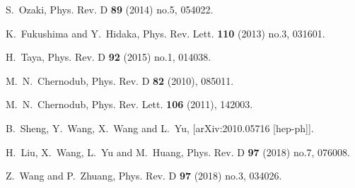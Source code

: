 \begin{thebibliography}{1000}
S.~Ozaki,
Phys. Rev. D \textbf{89} (2014) no.5, 054022.




K.~Fukushima and Y.~Hidaka,
Phys. Rev. Lett. \textbf{110} (2013) no.3, 031601.

H.~Taya,
Phys. Rev. D \textbf{92} (2015) no.1, 014038.

M.~N.~Chernodub,
Phys. Rev. D \textbf{82} (2010), 085011.

M.~N.~Chernodub,
Phys. Rev. Lett. \textbf{106} (2011), 142003.

B.~Sheng, Y.~Wang, X.~Wang and L.~Yu,
[arXiv:2010.05716 [hep-ph]].

H.~Liu, X.~Wang, L.~Yu and M.~Huang,
Phys. Rev. D \textbf{97} (2018) no.7, 076008.

Z.~Wang and P.~Zhuang,
Phys. Rev. D \textbf{97} (2018) no.3, 034026.



\end{thebibliography}

